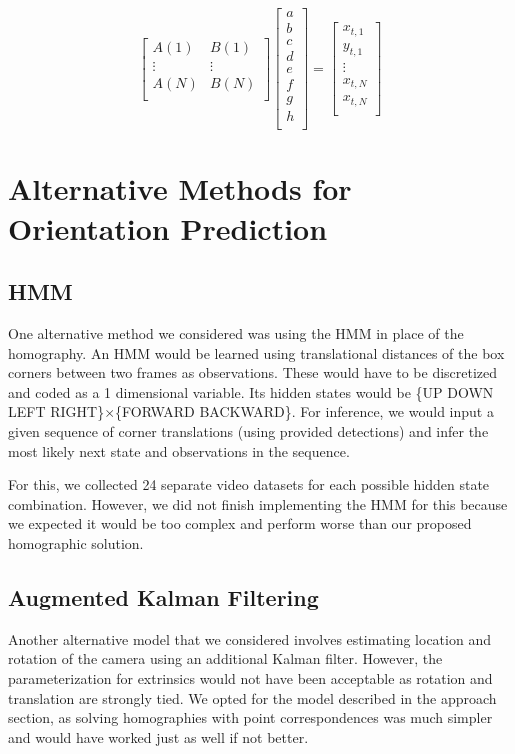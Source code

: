 \documentclass[letterpaper,10pt,conference]{IEEEtran}
\begin{document}
\begin{equation}
\begin{bmatrix}
A(1)& B(1)\\
\vdots&\vdots\\
A(N)& B(N) \\
\end{bmatrix}
\begin{bmatrix}
a\\
b\\
c\\
d\\
e\\
f\\
g\\
h\\
\end{bmatrix} = 
\begin{bmatrix}
x_{t,1}\\
y_{t,1}\\
\vdots\\
x_{t,N}\\
x_{t,N}\\
\end{bmatrix}
\end{equation}



\section{Alternative Methods for Orientation Prediction}
\subsection{HMM}
One alternative method we considered was using the HMM in place of the homography. An HMM would be learned using translational distances of the box corners between two frames as observations. These would have to be discretized and coded as a 1 dimensional variable. Its hidden states would be \{UP DOWN LEFT RIGHT\}$\times$\{FORWARD BACKWARD\}. For inference, we would input a given sequence of corner translations (using provided detections) and infer the most likely next state and observations in the sequence.

For this, we collected 24 separate video datasets for each possible hidden state combination. However, we did not finish implementing the HMM for this because we expected it would be too complex and perform worse than our proposed homographic solution.

\subsection{Augmented Kalman Filtering}
Another alternative model that we considered involves estimating location and rotation of the camera using an additional Kalman filter.  However, the parameterization for extrinsics would not have been acceptable as rotation and translation are strongly tied.  We opted for the model described in the approach section, as solving homographies with point correspondences was much simpler and would have worked just as well if not better.
\end{document}
